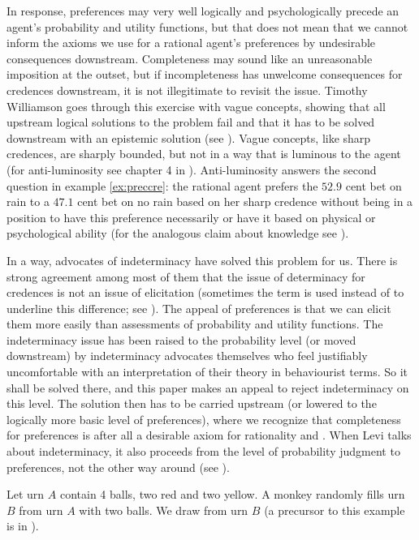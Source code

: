 \documentclass[11pt]{article}
\begin{document}
In response, preferences may very well logically and psychologically
precede an agent's probability and utility functions, but that does
not mean that we cannot inform the axioms we use for a rational
agent's preferences by undesirable consequences downstream.
Completeness may sound like an unreasonable imposition at the outset,
but if incompleteness has unwelcome consequences for credences
downstream, it is not illegitimate to revisit the issue. Timothy
Williamson goes through this exercise with vague concepts, showing
that all upstream logical solutions to the problem fail and that it
has to be solved downstream with an epistemic solution (see
). Vague concepts, like sharp credences, are
sharply bounded, but not in a way that is luminous to the agent (for
anti-luminosity see chapter 4 in ).
Anti-luminosity answers the second question in example
\ref{ex:preccre}: the rational agent prefers the $52.9$ cent bet on
rain to a $47.1$ cent bet on no rain based on her sharp credence
without being in a position to have this preference necessarily or
have it based on physical or psychological ability (for the analogous
claim about knowledge see ).

In a way, advocates of indeterminacy have solved this problem for us.
There is strong agreement among most of them that the issue of
determinacy for credences is not an issue of elicitation (sometimes
the term  is used instead of 
to underline this difference; see ). The appeal
of preferences is that we can elicit them more easily than assessments
of probability and utility functions. The indeterminacy issue has been
raised to the probability level (or moved downstream) by indeterminacy
advocates themselves who feel justifiably uncomfortable with an
interpretation of their theory in behaviourist terms. So it shall be
solved there, and this paper makes an appeal to reject indeterminacy
on this level. The solution then has to be carried upstream (or
lowered to the logically more basic level of preferences), where we
recognize that completeness for preferences is after all a desirable
axiom for rationality and  . When Levi talks
about indeterminacy, it also proceeds from the level of probability
judgment to preferences, not the other way around (see
).

\begin{quotex}
  \label{ex:monkey} Let urn $A$ contain 4
  balls, two red and two yellow. A monkey randomly fills urn $B$ from
  urn $A$ with two balls. We draw from urn $B$ (a precursor to this
  example is in ).
\end{quotex}
\end{document}
